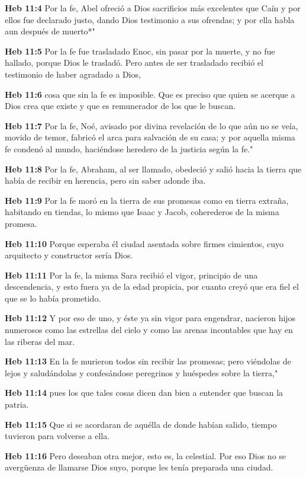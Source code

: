 \textbf{Heb 11:4} Por la fe, Abel ofreció a Dios sacrificios más excelentes que Caín y por ellos fue declarado justo, dando Dios testimonio a sus ofrendas; y por ella habla aun después de muerto*" 

\textbf{Heb 11:5} Por la fe fue trasladado Enoc, sin pasar por la muerte, y no fue hallado, porque Dios le trasladó. Pero antes de ser trasladado recibió el testimonio de haber agradado a Dios, 

\textbf{Heb 11:6} cosa que sin la fe es imposible. Que es preciso que quien se acerque a Dios crea que existe y que es remunerador de los que le buscan. 

\textbf{Heb 11:7} Por la fe, Noé, avisado por divina revelación de lo que aún no se veía, movido de temor, fabricó el arca para salvación de su casa; y por aquella misma fe condenó al mundo, haciéndose heredero de la justicia según la fe." 

\textbf{Heb 11:8} Por la fe, Abraham, al ser llamado, obedeció y salió hacia la tierra que había de recibir en herencia, pero sin saber adonde iba. 

\textbf{Heb 11:9} Por la fe moró en la tierra de sus promesas como en tierra extraña, habitando en tiendas, lo mismo que Isaac y Jacob, coherederos de la misma promesa. 

\textbf{Heb 11:10} Porque esperaba él ciudad asentada sobre firmes cimientos, cuyo arquitecto y constructor sería Dios. 

\textbf{Heb 11:11} Por la fe, la misma Sara recibió el vigor, principio de una descendencia, y esto fuera ya de la edad propicia, por cuanto creyó que era fiel el que se lo había prometido. 

\textbf{Heb 11:12} Y por eso de uno, y éste ya sin vigor para engendrar, nacieron hijos numerosos como las estrellas del cielo y como las arenas incontables que hay en las riberas del mar. 

\textbf{Heb 11:13} En la fe murieron todos sin recibir las promesas; pero viéndolas de lejos y saludándolas y confesándose peregrinos y huéspedes sobre la tierra," 

\textbf{Heb 11:14} pues los que tales cosas dicen dan bien a entender que buscan la patria. 

\textbf{Heb 11:15} Que si se acordaran de aquélla de donde habían salido, tiempo tuvieron para volverse a ella. 

\textbf{Heb 11:16} Pero deseaban otra mejor, esto es, la celestial. Por eso Dios no se avergüenza de llamarse Dios suyo, porque les tenía preparada una ciudad. 

